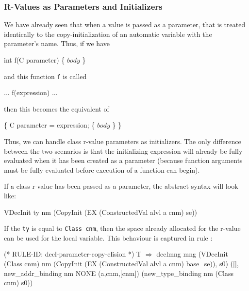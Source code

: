 \documentclass[11pt]{article}
\begin{document}
\subsubsection{R-Values as Parameters and Initializers}
\label{sec:rvalues-as-parameters}

We have already seen that when a value is passed as a parameter, that
is treated identically to the copy-initialization of an automatic
variable with the parameter's name.  Thus, if we have
\begin{stdrule}
   int f(C parameter) \{ \(\mathit{body}\) \}
\end{stdrule}
and this function \texttt{f} is called
\begin{stdrule}
   ... f(expression) ...
\end{stdrule}
then this becomes the equivalent of
\begin{stdrule}
   \{
     C parameter = expression;
     \{
       \(\mathit{body}\)
     \}
   \}
\end{stdrule}
Thus, we can handle class r-value parameters as initializers.  The
only difference between the two scenarios is that the initializing
expression will already be fully evaluated when it has been created as
a parameter (because function arguments must be fully evaluated before
execution of a function can begin).

If a class r-value has been passed as a parameter, the abstract syntax
will look like:
\begin{stdrule}
   VDecInit ty nm (CopyInit (EX (ConstructedVal alvl a cnm) se))
\end{stdrule}
If the \texttt{ty} is equal to \texttt{Class~cnm}, then the space
already allocated for the r-value can be used for the local variable.
This behaviour is captured in rule
:%
%
\begin{stdrule}
(* RULE-ID: decl-parameter-copy-elision *)
     T
   \(\Rightarrow\)
     declmng mng
       (VDecInit (Class cnm) nm
                 (CopyInit (EX (ConstructedVal alvl a cnm)
                               base_se)),
        s0)
       ([], new_addr_binding nm NONE (a,cnm,[cnm])
              (new_type_binding nm (Class cnm) s0))
\end{stdrule}
\end{document}

